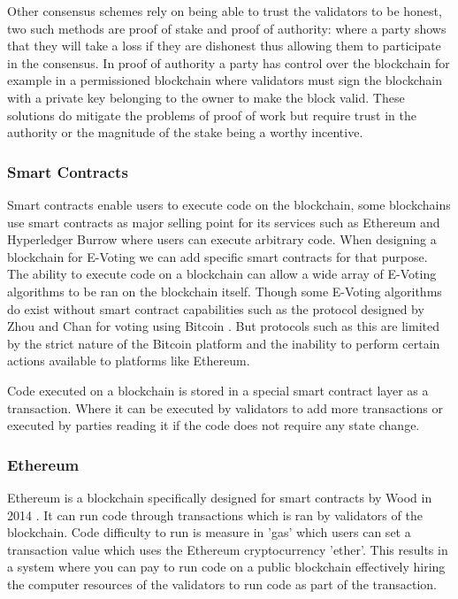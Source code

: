 \documentclass{entcs}
\begin{document}
Other consensus schemes rely on being able to trust the validators to be honest, two such methods are proof of stake and proof of authority\cite{blockchainBeginners}\cite{baliga2017understanding}: where a party shows that they will take a loss if they are dishonest thus allowing them to participate in the consensus. In proof of authority a party has control over the blockchain for example in a permissioned blockchain where validators must sign the blockchain with a private key belonging to the owner to make the block valid. These solutions do mitigate the problems of proof of work but require trust in the authority or the magnitude of the stake being a worthy incentive.

\subsubsection{Smart Contracts}
Smart contracts enable users to execute code on the blockchain, some blockchains use smart contracts as major selling point for its services such as Ethereum \cite{wood2014ethereum} and Hyperledger Burrow \cite{HyperLedgerBurrow} where users can execute arbitrary code. When designing a blockchain for E-Voting we can add specific smart contracts for that purpose. The ability to execute code on a blockchain can allow a wide array of E-Voting algorithms to be ran on the blockchain itself. Though some E-Voting algorithms do exist without smart contract capabilities such as the protocol designed by Zhou and Chan for voting using Bitcoin \cite{zhao2015vote}. But protocols such as this are limited by the strict nature of the Bitcoin platform and the inability to perform certain actions available to platforms like Ethereum.

Code executed on a blockchain is stored in a special smart contract layer as a transaction. Where it can be executed by validators to add more transactions or executed by parties reading it if the code does not require any state change.

\subsubsection{Ethereum}
Ethereum is a blockchain specifically designed for smart contracts by Wood in 2014 \cite{wood2014ethereum}. It can run code through transactions which is ran by validators of the blockchain. Code difficulty to run is measure in 'gas' which users can set a transaction value which uses the Ethereum cryptocurrency 'ether'. This results in a system where you can pay to run code on a public blockchain effectively hiring the computer resources of the validators to run code as part of the transaction.
\end{document}

